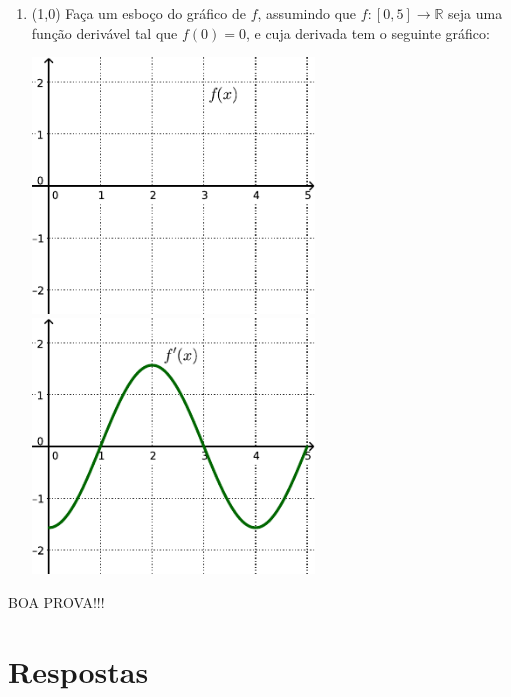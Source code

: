 \documentclass[12pt,a4paper]{article}
\newcommand*\R{\mathbb{R}}
\begin{document}
\begin{enumerate}
\item (1,0) Faça um esboço do gráfico de $f$, assumindo que $f: [0, 5] \to \R$ seja uma função derivável tal que $f(0)=0$, e cuja derivada tem o seguinte gráfico:

\includegraphics[width=7.5cm]{img/prova-3-tads-derivada-malha} $\quad$
\includegraphics[width=7.5cm]{img/prova-3-tads-derivada}
\end{enumerate}

\begin{center}
BOA PROVA!!!
\end{center}

\newpage
\restoregeometry
\section*{Respostas}
\end{document}
